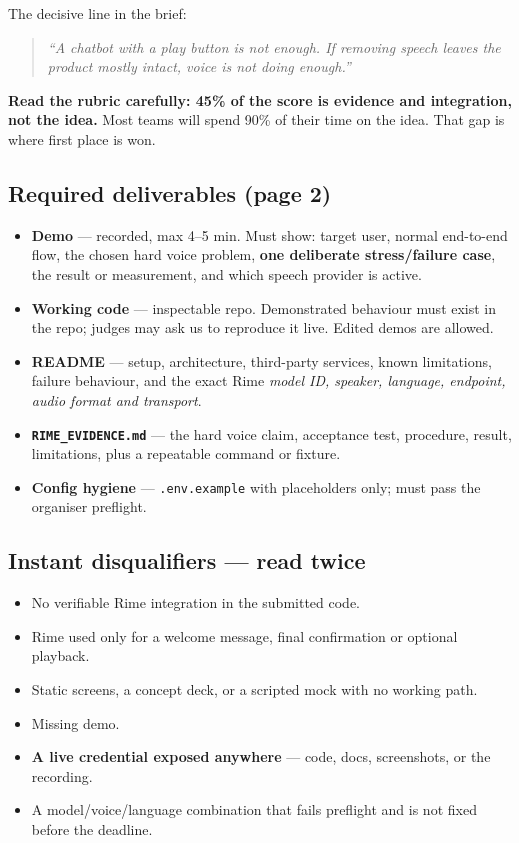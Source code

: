 \documentclass[11pt,a4paper]{article}
\newcommand{\code}[1]{\texttt{\small #1}}
\begin{document}
\vspace{0.4em}
The decisive line in the brief:

\begin{quote}\itshape
``A chatbot with a play button is not enough. If removing speech leaves the product
mostly intact, voice is not doing enough.''
\end{quote}

\textbf{Read the rubric carefully: 45\% of the score is evidence and integration, not the idea.}
Most teams will spend 90\% of their time on the idea. That gap is where first place is won.

\subsection{Required deliverables (page 2)}

\begin{itemize}
\item \textbf{Demo} --- recorded, max 4--5 min. Must show: target user, normal end-to-end
flow, the chosen hard voice problem, \textbf{one deliberate stress/failure case},
the result or measurement, and which speech provider is active.
\item \textbf{Working code} --- inspectable repo. Demonstrated behaviour must exist in the
repo; judges may ask us to reproduce it live. Edited demos are allowed.
\item \textbf{README} --- setup, architecture, third-party services, known limitations,
failure behaviour, and the exact Rime \emph{model ID, speaker, language, endpoint,
audio format and transport}.
\item \textbf{\code{RIME\_EVIDENCE.md}} --- the hard voice claim, acceptance test,
procedure, result, limitations, plus a repeatable command or fixture.
\item \textbf{Config hygiene} --- \code{.env.example} with placeholders only; must pass the
organiser preflight.
\end{itemize}

\subsection{Instant disqualifiers --- read twice}

\begin{itemize}
\item No verifiable Rime integration in the submitted code.
\item Rime used only for a welcome message, final confirmation or optional playback.
\item Static screens, a concept deck, or a scripted mock with no working path.
\item Missing demo.
\item \textbf{A live credential exposed anywhere} --- code, docs, screenshots, or the recording.
\item A model/voice/language combination that fails preflight and is not fixed before the deadline.
\end{itemize}
\end{document}
